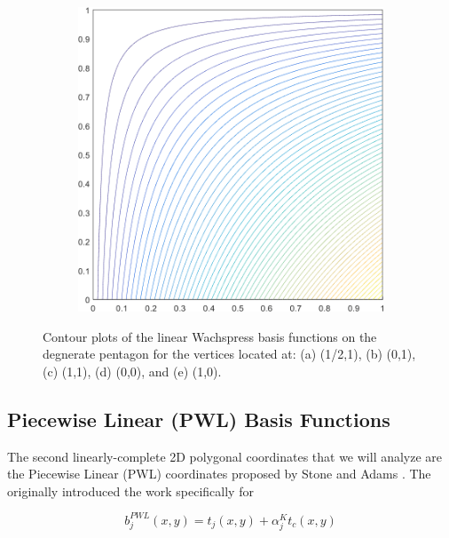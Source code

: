 \begin{figure}
\begin{subfigure}[b]{0.39\textwidth}
		\caption{}
	\end{subfigure}
	\hspace{1.5cm}
	\begin{subfigure}[b]{0.39\textwidth}
		\centering
		\includegraphics[width=\textwidth]{figures/sec_BF/deg_square_WACHSPRESS1_contour_b2.png}
		\caption{}
	\end{subfigure}
\caption{Contour plots of the linear Wachspress basis functions on the degnerate pentagon for the vertices located at: (a) (1/2,1), (b) (0,1), (c) (1,1), (d) (0,0), and (e) (1,0).}
\end{figure}

\subsection{Piecewise Linear (PWL) Basis Functions}
\label{sec::BF_2DLinear_PWL}

The second linearly-complete 2D polygonal coordinates that we will analyze are the Piecewise Linear (PWL) coordinates proposed by Stone and Adams \cite{ref::PWLD_stone_adams,ref::PWLD_stone_adams_unstructured}. The originally introduced the work specifically for 

\begin{equation}
\label{eq::PWL_2D}
	b_j^{PWL} (x,y) = t_j (x,y) + \alpha_j^K t_c (x,y)
\end{equation}

